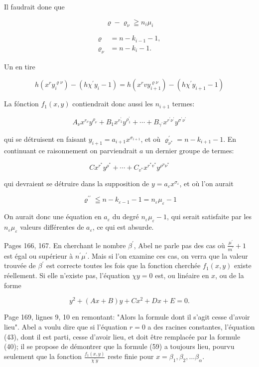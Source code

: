 \documentclass{article}
\begin{document}
Il faudrait done que

\[
\varrho-\varrho_{\nu} \geqq n_{i} \mu_{i}
\]

\[
\begin{aligned}
\varrho & =n-k_{i-1}-1, \\
\varrho_{\nu} & =n-k_{i}-1 .
\end{aligned}
\]

Un en tire

\[
h\left(x^{r} y_{i}^{\varrho \nu}\right)-\left(h \chi^{\prime} y_{i}-1\right)=h\left(x^{r} v y_{i+1}^{\varrho \nu}\right)-\left(h \chi^{\prime} y_{i+1}-1\right)
\]

La fónction \(f_{1}(x, y)\) contiendrait donc aussi les \(n_{i+1}\) termes:

\[
A_{\nu} x^{r_{\nu}} y^{\rho_{\nu}}+B_{1} x^{r_{1}^{\prime}} y^{\rho_{1}^{\prime}}+\cdots+B_{\gamma^{\prime}} x^{r^{\prime} \nu^{\prime}} y^{\sigma^{\prime} \nu^{\prime}}
\]

qui se détruisent en faisant \(y_{i+1}=a_{i+1} x^{\sigma_{i+1}}\), et où \(\varrho_{\nu^{*}}^{\prime}=n-k_{i+1}-1\). En continuant ce raisonnement on parviendrait \(a\) un dernier groupe de termes:

\[
C x^{r^{*}} y^{\rho^{*}}+\cdots+C_{v^{*}} x^{r^{*} v^{*}} y^{\rho^{\mu} \nu^{*}}
\]

qui devraient se détruire dans la supposition de \(y=a_{\varepsilon} x^{\sigma_{\varepsilon}}\), et où l'on aurait

\[
\varrho^{\prime \prime} \leqq n-k_{\varepsilon-1}-1=n_{\varepsilon} \mu_{\varepsilon}-1
\]

On aurait donc une équation en \(a_{\varepsilon}\) du degré \(n_{\varepsilon} \mu_{\varepsilon}-1\), qui serait satisfaite par les \(n_{\varepsilon} \mu_{\varepsilon}\) valeurs différentes de \(a_{\varepsilon}\), ce qui est absurde.

Pages 166, 167. En cherchant le nombre \(\beta^{\prime}\), Abel ne parle pas des cas où \(\frac{\mu^{\prime}}{m^{\prime}}+1\) est égal ou supérieur à \(n^{\prime} \mu^{\prime}\). Mais si l'on examine ces cas, on verra que la valeur trouvée de \(\beta^{\prime}\) est correcte toutes les fois que la fonction cherchée \(f_{1}(x, y)\) existe réellement. Si elle n'existe pas, l'équation \(\chi y=0\) est, ou linéaire en \(x\), ou de la forme

\[
y^{2}+(A x+B) y+C x^{2}+D x+E=0 .
\]

Page 169, lignes 9, 10 en remontant: "Alors la formule dont il s'agit cesse d'avoir lieu". Abel a voulu dire que si l'équation \(r=0\) a des racines constantes, l'équation (43), dont il est parti, cesse d'avoir lieu, et doit être remplacée par la formule (40); il se propose de démontrer que la formule (59) a toujours lieu, pourvu seulement que la fonction \(\frac{f_{1}(x, y)}{\chi^{\prime} y}\) reste finie pour \(x=\beta_{1}, \beta_{2}, \ldots \beta_{\alpha}\).
\end{document}
